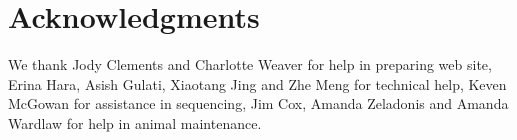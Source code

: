 \section{Acknowledgments}
We thank Jody Clements and Charlotte Weaver for help in preparing web site, Erina Hara, Asish Gulati, Xiaotang Jing and Zhe Meng for technical help, Keven McGowan for assistance in sequencing, Jim Cox, Amanda Zeladonis and Amanda Wardlaw for help in animal maintenance. 